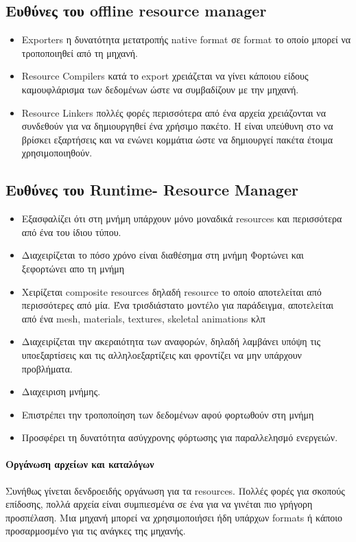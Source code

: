 \subsection{Ευθύνες του offline resource manager}
\begin{itemize}
\item Exporters η δυνατότητα μετατροπής native format σε format το οποίο μπορεί να τροποποιηθεί από τη μηχανή.
\item Resource Compilers κατά το export χρειάζεται να γίνει κάποιου είδους καμουφλάρισμα των δεδομένων ώστε να συμβαδίζουν με την μηχανή.
\item Resource Linkers πολλές φορές περισσότερα από ένα αρχεία χρειάζονται να συνδεθούν για να δημιουργηθεί ένα χρήσιμο πακέτο. Η είναι υπεύθυνη στο να βρίσκει εξαρτήσεις και να ενώνει κομμάτια ώστε να δημιουργεί πακέτα έτοιμα χρησιμοποιηθούν.
\end{itemize}

\subsection{Ευθύνες του Runtime- Resource Manager}
\begin{itemize}
\item Εξασφαλίζει ότι στη μνήμη υπάρχουν μόνο μοναδικά resources και περισσότερα από ένα του ίδιου τύπου.
\item Διαχειρίζεται το πόσο χρόνο είναι διαθέσημα στη μνήμη
Φορτώνει και ξεφορτώνει απο τη μνήμη
\item Χειρίζεται composite resources δηλαδή resource το οποίο αποτελείται από περισσότερες από μία. Ένα τρισδιάστατο μοντέλο για παράδειγμα, αποτελείται από ένα mesh, materials, textures, skeletal animations κλπ
\item Διαχειρίζεται την ακεραιότητα των αναφορών, δηλαδή λαμβάνει υπόψη τις υποεξαρτίσεις και τις αλληλοεξαρτίζεις και φροντίζει να μην υπάρχουν προβλήματα.
\item Διαχειριση μνήμης.
\item Επιστρέπει την τροποποίηση των δεδομένων αφού φορτωθούν στη μνήμη
\item Προσφέρει τη δυνατότητα ασύγχρονης φόρτωσης για παραλλελησμό ενεργειών.
\end{itemize}

\paragraph{Οργάνωση αρχείων και καταλόγων}
Συνήθως γίνεται δενδροειδής οργάνωση για τα resources.  Πολλές φορές για σκοπούς επίδοσης, πολλά αρχεία είναι συμπιεσμένα σε ένα για να γινέται πιο γρήγορη προσπέλαση. Μια μηχανή μπορεί να χρησιμοποιήσει ήδη υπάρχων formats ή κάποιο προσαρμοσμένο για τις ανάγκες της μηχανής. 

